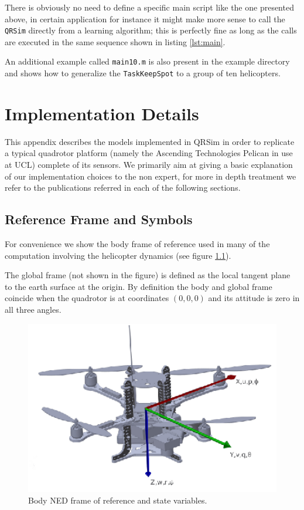 \documentclass[a4paper,11pt]{report}
\newcommand{\sname}{QRSim\xspace}
\newcommand{\snamettt}{\texttt{QRSim}\xspace}
\begin{document}
There is obviously no need to define a specific main script like the one presented above, in certain application for instance it might make more sense to call the \snamettt directly from  a learning algorithm; this is perfectly fine as long as the calls are executed in the same sequence shown in listing \ref{lst:main}.

An additional example called \texttt{main10.m} is also present in the example directory and shows how to generalize the \texttt{TaskKeepSpot} to a group of ten helicopters.

\appendix
\chapter{Implementation Details}

This appendix describes the models implemented in \sname in order to replicate a typical quadrotor platform (namely the Ascending Technologies Pelican \cite{asctec2011pelican} in use at UCL) complete of its sensors.
We primarily aim at giving a basic explanation of our implementation choices to the non expert, for more in depth treatment we refer to the publications referred in each of the following sections.

\section{Reference Frame and Symbols}

For convenience we show the body frame of reference used in many of the computation involving the helicopter dynamics (see figure \ref{fig:axes}).
 
The global frame (not shown in the figure) is defined as the local tangent plane to the earth surface at the origin. 
By definition the body and global frame coincide when the quadrotor is at coordinates $(0,0,0)$ and its attitude is zero in all three angles.
\begin{figure}[htbp]
 \begin{center}
 \includegraphics[width=13cm]{./axes.eps}
\caption{Body NED frame of reference and state variables.\label{fig:axes}}
\end{center}
\end{figure} 
\end{document}
